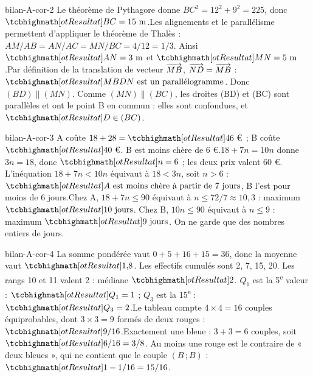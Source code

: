 \begin{blocEdition}{bilan-A-cor-2}
Le théorème de Pythagore donne $BC^2=12^2+9^2=225$, donc $\res{BC=15\text{ m}}$.Les alignements et le parallélisme permettent d’appliquer le théorème de Thalès : $AM/AB=AN/AC=MN/BC=4/12=1/3$. Ainsi $\res{AN=3\text{ m}}$ et $\res{MN=5\text{ m}}$.Par définition de la translation de vecteur $\overrightarrow{MB}$, $\overrightarrow{ND}=\overrightarrow{MB}$ : $\res{MBDN\text{ est un parallélogramme}}$. Donc $(BD)\parallel(MN)$. Comme $(MN)\parallel(BC)$, les droites (BD) et (BC) sont parallèles et ont le point B en commun : elles sont confondues, et $\res{D\in(BC)}$.\label{fig-bilan-A-cor-2}

\end{blocEdition}
\begin{blocEdition}{bilan-A-cor-3}
A coûte $18+28=\res{46\text{ €}}$ ; B coûte $\res{40\text{ €}}$. B est moins chère de 6 €.$18+7n=10n$ donne $3n=18$, donc $\res{n=6}$ ; les deux prix valent 60 €. L’inéquation $18+7n<10n$ équivaut à $18<3n$, soit $n>6$ : $\res{A\text{ est moins chère à partir de 7 jours}}$, B l’est pour moins de 6 jours.Chez A, $18+7n\le90$ équivaut à $n\le72/7\approx10{,}3$ : maximum $\res{10\text{ jours}}$. Chez B, $10n\le90$ équivaut à $n\le9$ : maximum $\res{9\text{ jours}}$. On ne garde que des nombres entiers de jours.\label{fig-bilan-A-cor-3}

\end{blocEdition}
\begin{blocEdition}{bilan-A-cor-4}
La somme pondérée vaut $0+5+16+15=36$, donc la moyenne vaut $\res{1{,}8}$. Les effectifs cumulés sont 2, 7, 15, 20. Les rangs 10 et 11 valent 2 : médiane $\res2$. $Q_1$ est la 5\textsuperscript{e} valeur : $\res{Q_1=1}$ ; $Q_3$ est la 15\textsuperscript{e} : $\res{Q_3=2}$.Le tableau compte $4\times4=16$ couples équiprobables, dont $3\times3=9$ formés de deux rouges : $\res{9/16}$.Exactement une bleue : $3+3=6$ couples, soit $\res{6/16=3/8}$. Au moins une rouge est le contraire de « deux bleues », qui ne contient que le couple $(B\,;B)$ : $\res{1-1/16=15/16}$.\label{fig-bilan-A-cor-4}

\end{blocEdition}
